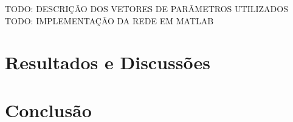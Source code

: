 \documentclass[
	12pt,				%
	openright,			%
	oneside,
	a4paper,			%
	english,			%
	francais,			%
	spanish,			%
	brazil				%
	]{abntex2}
\begin{document}
	TODO: DESCRIÇÃO DOS VETORES DE PARÂMETROS UTILIZADOS
	TODO: IMPLEMENTAÇÃO DA REDE EM MATLAB

\chapter{Resultados e Discussões}



\chapter{Conclusão}

\postextual


\end{document}
